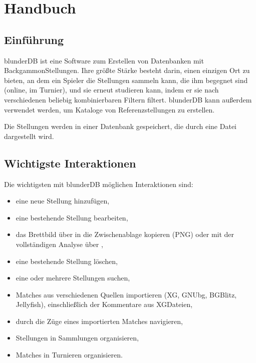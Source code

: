 \documentclass[letterpaper,10pt,german]{sphinxmanual}
\begin{document}
\sphinxstepscope


\section{Handbuch}
\label{\detokenize{manuel:manuel}}\label{\detokenize{manuel:id1}}\label{\detokenize{manuel::doc}}

\subsection{Einführung}
\label{\detokenize{manuel:introduction}}
\sphinxAtStartPar
blunderDB ist eine Software zum Erstellen von Datenbanken mit Backgammon\sphinxhyphen{}Stellungen. Ihre größte Stärke besteht darin, einen einzigen Ort zu bieten, an dem ein Spieler die Stellungen sammeln kann, die ihm begegnet sind (online, im Turnier), und sie erneut studieren kann, indem er sie nach verschiedenen beliebig kombinierbaren Filtern filtert. blunderDB kann außerdem verwendet werden, um Kataloge von Referenzstellungen zu erstellen.

\sphinxAtStartPar
Die Stellungen werden in einer Datenbank gespeichert, die durch eine Datei  dargestellt wird.


\subsection{Wichtigste Interaktionen}
\label{\detokenize{manuel:interactions-principales}}
\sphinxAtStartPar
Die wichtigsten mit blunderDB möglichen Interaktionen sind:
\begin{itemize}
\item {} 
\sphinxAtStartPar
eine neue Stellung hinzufügen,

\item {} 
\sphinxAtStartPar
eine bestehende Stellung bearbeiten,

\item {} 
\sphinxAtStartPar
das Brettbild über  in die Zwischenablage kopieren (PNG) oder mit der vollständigen Analyse über ,

\item {} 
\sphinxAtStartPar
eine bestehende Stellung löschen,

\item {} 
\sphinxAtStartPar
eine oder mehrere Stellungen suchen,

\item {} 
\sphinxAtStartPar
Matches aus verschiedenen Quellen importieren (XG, GNUbg, BGBlitz, Jellyfish), einschließlich der Kommentare aus XG\sphinxhyphen{}Dateien,

\item {} 
\sphinxAtStartPar
durch die Züge eines importierten Matches navigieren,

\item {} 
\sphinxAtStartPar
Stellungen in Sammlungen organisieren,

\item {} 
\sphinxAtStartPar
Matches in Turnieren organisieren.

\end{itemize}
\end{document}
